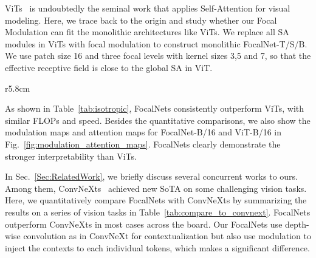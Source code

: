 \documentclass{article}
\begin{document}
ViTs~\cite{dosovitskiy2020image} is undoubtedly the seminal work that applies Self-Attention for visual modeling. Here, we trace back to the origin and study whether our Focal Modulation can fit the monolithic architectures like ViTs. We replace all SA modules in ViTs with focal modulation to construct monolithic FocalNet-T/S/B. We use patch size 16 and three focal levels with kernel sizes 3,5 and 7, so that the effective receptive field is close to the global SA in ViT. 
\begin{wraptable}{r}{5.8cm}
\vspace{-10pt}
\footnotesize
{}
    \vspace{-5pt}
    \captionsetup{font=footnotesize}    
    \caption{Comparisons between FocalNet and ViT both with monolithic architectures.}
    \vspace{-8pt}
    \label{tab:isotropic}
\end{wraptable}
As shown in Table~\ref{tab:isotropic}, FocalNets consistently outperform ViTs, with similar FLOPs and speed. Besides the quantitative comparisons, we also show the modulation maps and attention maps for FocalNet-B/16 and ViT-B/16 in Fig.~\ref{fig:modulation_attention_maps}. FocalNets clearly demonstrate the stronger interpretability than ViTs.

In Sec.~\ref{Sec:RelatedWork}, we briefly discuss several concurrent works to ours. Among them, ConvNeXts~\cite{liu2022convnet} achieved new SoTA on some challenging vision tasks. Here, we quantitatively compare FocalNets with ConvNeXts by summarizing the results on a series of vision tasks in Table~\ref{tab:compare_to_convnext}. FocalNets outperform ConvNeXts in most cases across the board. Our FocalNets use depth-wise convolution as in ConvNeXt for contextualization but also use modulation to inject the contexts to each individual tokens, which makes a significant difference. 
\end{document}
